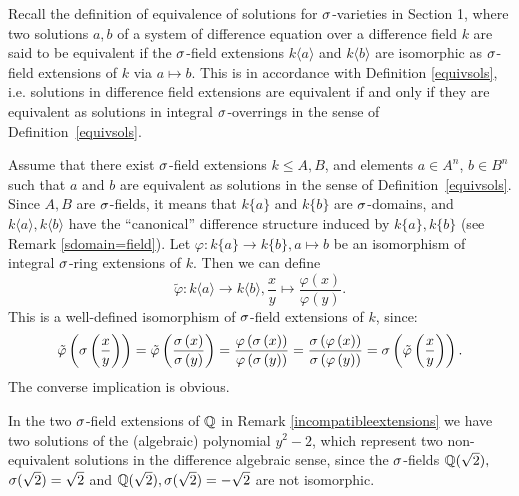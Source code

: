 \begin{rem}
Recall the definition of equivalence of solutions for $\sigma$-varieties in Section 1, where two solutions $a,b$ of a system of difference equation over a difference field $k$ are said to be equivalent if the $\sigma$-field extensions $k\langle a \rangle$ and $k\langle b \rangle$ are isomorphic as $\sigma$-field extensions of $k$ via $a \mapsto b$.
This is in accordance with Definition \ref{equivsols}, i.e. solutions in difference field extensions are equivalent if and only if they are equivalent as solutions in integral $\sigma$-overrings in the sense of Definition~\ref{equivsols}.
\begin{bew}
Assume that there exist $\sigma$-field extensions $k \leq A,B$, and elements $a \in A^n$, $b \in B^n$ such that $a$ and $b$ are equivalent as solutions in the sense of Definition~\ref{equivsols}. Since $A,B$ are $\sigma$-fields, it means that $k\{a\}$ and $k\{b\}$ are $\sigma$-domains, 
and $k\langle a \rangle, k\langle b \rangle$ have the ``canonical'' difference structure induced by $k\{a\}, k\{b\}$ (see Remark \ref{sdomain=field}). Let $\varphi: k\{a\} \rightarrow k\{b\}, a \mapsto b$ be an isomorphism of integral $\sigma$-ring extensions of $k$.
Then we can define $$\tilde \varphi: k \langle a \rangle \rightarrow k\langle b \rangle, \frac{x}{y} \mapsto \frac{\varphi(x)}{\varphi{(y)}}.$$ This is a well-defined isomorphism of $\sigma$-field extensions of $k$, since:
\begin{align*}
\tilde \varphi \left(\sigma \left(\frac{x}{y}\right)\right) = \tilde \varphi \left( \frac{\sigma \left(x\right)}{\sigma \left(y\right)}\right) = \frac{ \varphi \left(\sigma \left(x\right)\right)}{ \varphi \left(\sigma \left(y\right)\right)} =  \frac{\sigma \left(\varphi \left(x\right)\right)}{\sigma \left(\varphi \left(y\right)\right)} = \sigma \left( \tilde \varphi \left(\frac{x}{y}\right)\right).
\end{align*}
The converse implication is obvious.
\end{bew}
\end{rem}

\begin{ex}
In the two $\sigma$-field extensions of $\mathbb{Q}$ in Remark \ref{incompatibleextensions} we have two solutions of the (algebraic) polynomial $y^2-2$, which represent two non-equivalent solutions in the difference algebraic sense,
since the $\sigma$-fields $\mathbb{Q}(\sqrt{2}),$ \\ $\sigma(\sqrt{2}) = \sqrt{2}$ and $\mathbb{Q}(\sqrt{2}), \sigma(\sqrt{2}) = -\sqrt{2}$ are not isomorphic. 
\end{ex}

